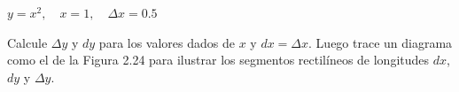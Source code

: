 \setcounter{enumi}{16}
\item $y = x^2, \quad x = 1, \quad \Delta x = 0.5$
\par
Calcule $\Delta y$ y $dy$ para los valores dados de $x$ y $dx = \Delta x$. Luego trace un diagrama como el de la Figura 2.24 para ilustrar los segmentos rectilíneos de longitudes $dx$, $dy$ y $\Delta y$.
